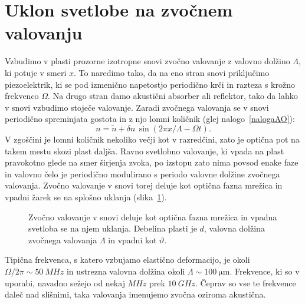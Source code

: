 \section{Uklon svetlobe na zvočnem valovanju}
Vzbudimo v plasti prozorne izotropne snovi zvočno valovanje z valovno dolžino $\Lambda$, 
ki potuje v smeri $x$. To naredimo tako, da na eno stran snovi priključimo piezoelektrik, 
ki se pod izmenično napetostjo periodično krči in razteza s krožno frekvenco $\Omega$.
Na drugo stran damo akustični absorber ali reflektor, tako da lahko 
v snovi vzbudimo stoječe valovanje. 
Zaradi zvočnega valovanja se v snovi periodično spreminjata gostota in 
z njo lomni količnik (glej nalogo~\ref{nalogaAO}):
\begin{equation}
n = \tilde{n} + \delta n \,\sin \left(2\pi x/\Lambda- \Omega t\right)\!.
\end{equation}
V zgoščini je lomni količnik nekoliko večji kot v razredčini, zato je optična pot na takem mestu
skozi plast daljša. Ravno svetlobno valovanje, ki vpada na plast pravokotno glede
na smer širjenja zvoka, po izstopu zato nima povsod enake faze in valovno čelo 
je periodično modulirano s periodo 
valovne dolžine zvočnega valovanja. Zvočno valovanje v snovi torej deluje kot 
optična fazna mrežica in vpadni žarek se na splošno uklanja (slika~\ref{fig:ao}). 
\begin{figure}[ht]
\centering
\def\svgwidth{50truemm} 

\caption{Zvočno valovanje v snovi deluje kot optična fazna mrežica in vpadna svetloba 
se na njem uklanja. Debelina plasti je $d$, valovna dolžina zvočnega valovanja $\Lambda$
in vpadni kot $\vartheta$.}
\label{fig:ao}
\end{figure}

Tipična frekvenca, s katero vzbujamo elastično
deformacijo, je okoli $\Omega/2\pi \sim 50~\si{MHz}$ in ustrezna valovna dolžina okoli 
$\Lambda \sim 100~\si{\micro\metre}$. Frekvence, ki so v uporabi, navadno sežejo od 
nekaj $\si{MHz}$ prek $10~\si{GHz}$. Čeprav so vse te frekvence
daleč nad slišnimi, taka valovanja imenujemo zvočna oziroma akustična. 

